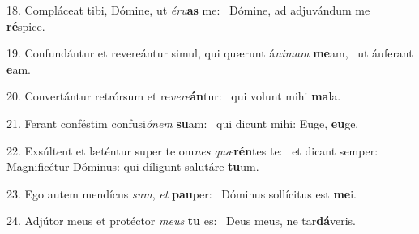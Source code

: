 18. Compláceat tibi, Dómine, ut \textit{é}\textit{ru}\textbf{as} me: \ast\  Dómine, ad adjuvándum me \textbf{ré}spice.\

19. Confundántur et revereántur simul, qui quærunt á\textit{ni}\textit{mam} \textbf{me}am, \ast\  ut áuferant \textbf{e}am.\

20. Convertántur retrórsum et re\textit{ve}\textit{re}\textbf{án}tur: \ast\  qui volunt mihi \textbf{ma}la.\

21. Ferant conféstim confusi\textit{ó}\textit{nem} \textbf{su}am: \ast\  qui dicunt mihi: Euge, \textbf{eu}ge.\

22. Exsúltent et læténtur super te om\textit{nes} \textit{quæ}\textbf{rén}tes te: \ast\  et dicant semper: Magnificétur Dóminus: qui díligunt salutáre \textbf{tu}um.\

23. Ego autem mendícus \textit{sum}, \textit{et} \textbf{pau}per: \ast\  Dóminus sollícitus est \textbf{me}i.\

24. Adjútor meus et protéctor \textit{me}\textit{us} \textbf{tu} es: \ast\  Deus meus, ne tar\textbf{dá}veris.\

